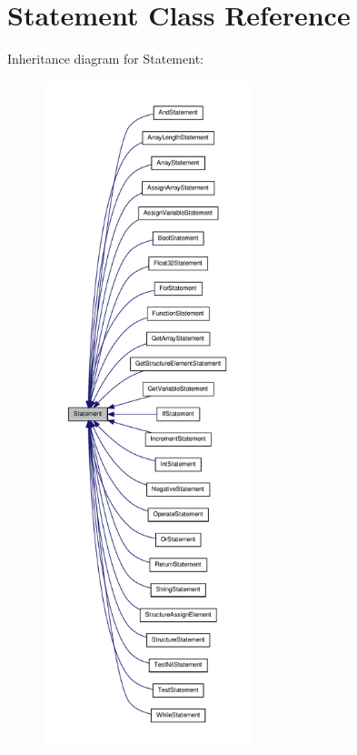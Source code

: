 \hypertarget{class_statement}{\section{Statement Class Reference}
\label{class_statement}
}


Inheritance diagram for Statement\-:
\nopagebreak
\begin{figure}[H]
\begin{center}
\leavevmode
\includegraphics[height=550pt]{class_statement__inherit__graph}
\end{center}
\end{figure}
